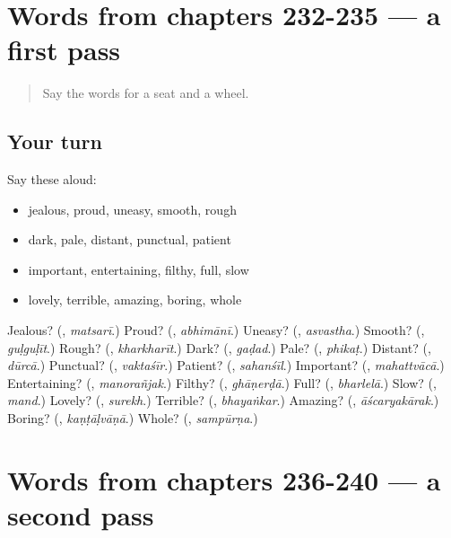 \section[(dialogue)]{Words from chapters 232-235 — a first pass}

\label{lesson:MR-R240-first-pass-words-from-chapters-232-235}



\begin{quote}
Say the words for a seat and a wheel.
\end{quote}

\subsection*{Your turn}
Say these aloud:

\begin{itemize}
\raggedright
  \item jealous, proud, uneasy, smooth, rough
  \item dark, pale, distant, punctual, patient
  \item important, entertaining, filthy, full, slow
  \item lovely, terrible, amazing, boring, whole
\end{itemize}

\begin{tcolorbox}[breakable,colback=teal!4,colframe=teal!35!black,title={Before you move on}]
Jealous? (\textbf{}, \emph{matsarī}.) Proud? (\textbf{}, \emph{abhimānī}.) Uneasy? (\textbf{}, \emph{asvastha}.) Smooth? (\textbf{}, \emph{guḷguḷīt}.) Rough? (\textbf{}, \emph{kharkharīt}.) Dark? (\textbf{}, \emph{gaḍad}.) Pale? (\textbf{}, \emph{phikaṭ}.) Distant? (\textbf{}, \emph{dūrcā}.) Punctual? (\textbf{}, \emph{vaktaśīr}.) Patient? (\textbf{}, \emph{sahanśīl}.) Important? (\textbf{}, \emph{mahattvācā}.) Entertaining? (\textbf{}, \emph{manorañjak}.) Filthy? (\textbf{}, \emph{ghāṇerḍā}.) Full? (\textbf{}, \emph{bharlelā}.) Slow? (\textbf{}, \emph{mand}.) Lovely? (\textbf{}, \emph{surekh}.) Terrible? (\textbf{}, \emph{bhayaṅkar}.) Amazing? (\textbf{}, \emph{āścaryakārak}.) Boring? (\textbf{}, \emph{kaṇṭāḷvāṇā}.) Whole? (\textbf{}, \emph{sampūrṇa}.)
\end{tcolorbox}
\section[(dialogue)]{Words from chapters 236-240 — a second pass}

